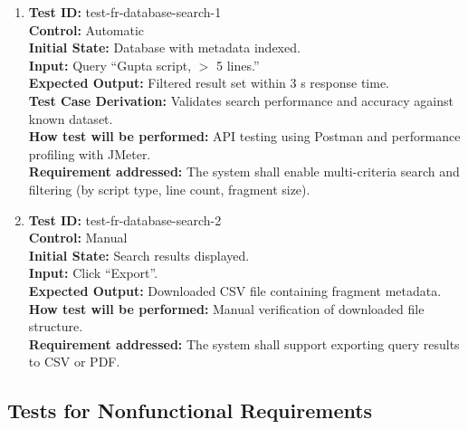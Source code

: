 \documentclass[12pt, titlepage]{article}
\begin{document}
\begin{enumerate}
\item
\textbf{Test ID:} test-fr-database-search-1\\
\textbf{Control:} Automatic\\
\textbf{Initial State:} Database with metadata indexed.\\
\textbf{Input:} Query ``Gupta script, $>$ 5 lines.''\\
\textbf{Expected Output:} Filtered result set within 3 s response time.\\
\textbf{Test Case Derivation:} Validates search performance and accuracy against known dataset.\\
\textbf{How test will be performed:} API testing using Postman and performance profiling with JMeter.\\
\textbf{Requirement addressed:} The system shall enable multi-criteria search and filtering (by script type, line count, fragment size).\\

\item
\textbf{Test ID:} test-fr-database-search-2\\
\textbf{Control:} Manual\\
\textbf{Initial State:} Search results displayed.\\
\textbf{Input:} Click ``Export''.\\
\textbf{Expected Output:} Downloaded CSV file containing fragment metadata.\\
\textbf{How test will be performed:} Manual verification of downloaded file structure.\\
\textbf{Requirement addressed:} The system shall support exporting query results to CSV or PDF.\\
\end{enumerate}

\subsection{Tests for Nonfunctional Requirements}


\end{document}
